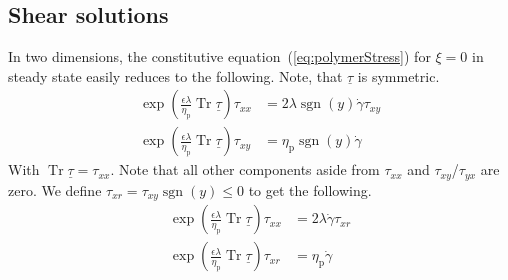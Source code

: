 \documentclass[a4paper,12pt]{scrartcl}
\newcommand{\ma}[1]{\underline{#1}}
\DeclareMathOperator{\Tr}{Tr}
\DeclareMathOperator{\sgn}{sgn}
\begin{document}
\subsection{Shear solutions}
In two dimensions, the constitutive equation~(\ref{eq:polymerStress}) for $\xi=0$ in steady state easily reduces to the following. Note, that $\ma{\tau}$ is symmetric.
\begin{align}
	\exp\left(\frac{\epsilon\lambda}{\eta_\text{p}}\Tr\ma{\tau}\right)\tau_{xx} &= 2\lambda\sgn\left(y\right)\dot{\gamma}\tau_{xy}\\
	\exp\left(\frac{\epsilon\lambda}{\eta_\text{p}}\Tr\ma{\tau}\right)\tau_{xy} &= \eta_\text{p}\sgn\left(y\right)\dot{\gamma}
\end{align}
With $\Tr\ma{\tau} = \tau_{xx}$. Note that all other components aside from $\tau_{xx}$ and $\tau_{xy}$/$\tau_{yx}$ are zero.
We define $\tau_{xr} = \tau_{xy}\sgn\left(y\right) \leq 0$ to get the following.
\begin{align}
	\exp\left(\frac{\epsilon\lambda}{\eta_\text{p}}\Tr\ma{\tau}\right)\tau_{xx} &= 2\lambda\dot{\gamma}\tau_{xr} \label{eq:PTTDerivation1}\\
	\exp\left(\frac{\epsilon\lambda}{\eta_\text{p}}\Tr\ma{\tau}\right)\tau_{xr} &= \eta_\text{p}\dot{\gamma} \label{eq:PTTDerivation2}
\end{align}
\end{document}
